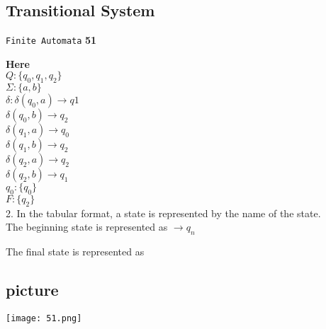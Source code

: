 \documentclass[8pt]{beamer}
\begin{document}
\begin{frame}
\section*{Transitional System}
\begin{flushright}
 \texttt{Finite Automata} \hspace*{1cm} \textbf{51}
\end{flushright}

\vspace*{0.2cm}
\textbf{Here}\\
\hspace*{1.5cm} $Q : \{q_{0}, q_{1}, q_{2}\}$ \\
\hspace*{1.5cm} $\Sigma : \{a, b\}$ \\
\hspace*{1.5cm} $\delta : \delta(q_{0}, a) \rightarrow q1$ \\
\hspace*{2cm} $\delta(q_{0}, b) \rightarrow q_{2}$ \\
\hspace*{2cm} $\delta(q_{1}, a) \rightarrow q_{0}$ \\
\hspace*{2cm} $\delta(q_{1}, b) \rightarrow q_{2}$ \\
\hspace*{2cm} $\delta(q_{2}, a) \rightarrow q_{2}$ \\
\hspace*{2cm} $\delta(q_{2}, b) \rightarrow q_{1}$ \\
\hspace*{1.5cm} $q_{0} : \{q_{0}\}$ \\
\hspace*{1.5cm} $F : \{q_{2}\}$ \\

\vspace*{0.2cm}
2. In the tabular format, a state is represented by the name of the state.\\
The beginning state is represented as $\rightarrow q_{n}$ \\
\end{frame}

\begin{frame}
\hspace*{0.4cm} The final state is represented as 

\vspace*{0.3cm}
\begin{center}
\section{picture}
\texttt{[image: 51.png]}
\end{center}

\end{frame}
\end{document}
